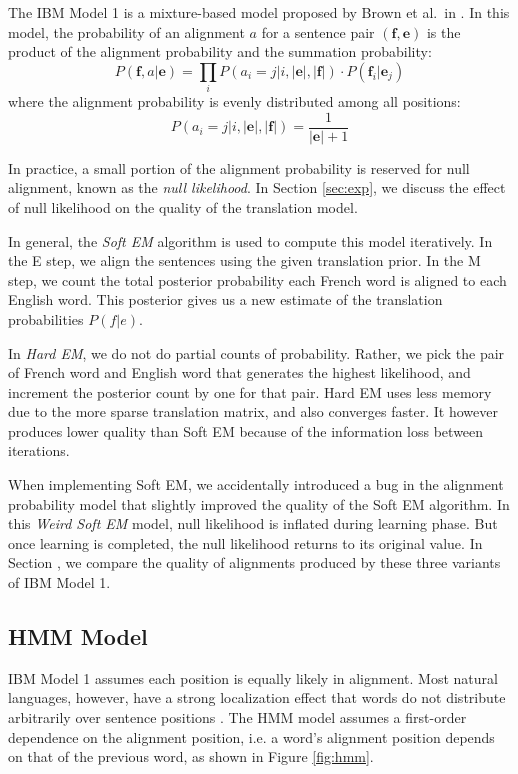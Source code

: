 \documentclass[12pt]{article}   %
\begin{document}
The IBM Model 1 is a mixture-based model proposed by Brown et al.~in \cite{ibm-models}. In this model, the probability of an alignment $a$ for a sentence pair $(\mathbf{f}, \mathbf{e})$ is the product of the alignment probability and the summation probability:
$$ P(\mathbf{f}, a|\mathbf{e}) = \prod_{i} P(a_i = j|i, |\mathbf{e}|, |\mathbf{f}|) \cdot P(\mathbf{f}_i|\mathbf{e}_j) $$
where the alignment probability is evenly distributed among all positions:
$$ P(a_i = j|i, |\mathbf{e}|, |\mathbf{f}|) = \frac{1}{|\mathbf{e}| + 1} $$

In practice, a small portion of the alignment probability is reserved for null alignment, known as the \emph{null likelihood}. In Section \ref{sec:exp}, we discuss the effect of null likelihood on the quality of the translation model.

In general, the \emph{Soft EM} algorithm is used to compute this model iteratively. In the E step, we align the sentences using the given translation prior. In the M step, we count the total posterior probability each French word is aligned to each English word. This posterior gives us a new estimate of the translation probabilities $P(f|e)$.

In \emph{Hard EM}, we do not do partial counts of probability. Rather, we pick the pair of French word and English word that generates the highest likelihood, and increment the posterior count by one for that pair. Hard EM uses less memory due to the more sparse translation matrix, and also converges faster. It however produces lower quality than Soft EM because of the information loss between iterations.

When implementing Soft EM, we accidentally introduced a bug in the alignment probability model that slightly improved the quality of the Soft EM algorithm. In this \emph{Weird Soft EM} model, null likelihood is inflated during learning phase. But once learning is completed, the null likelihood returns to its original value. In Section \label{sec:exp}, we compare the quality of alignments produced by these three variants of IBM Model 1.


\subsection{HMM Model}
IBM Model 1 assumes each position is equally likely in alignment. Most natural languages, however, have a strong localization effect that words do not distribute arbitrarily over sentence positions \cite{hmm-model}. The HMM model assumes a first-order dependence on the alignment position, i.e. a word's alignment position depends on that of the previous word, as shown in Figure \ref{fig:hmm}.
\end{document}
